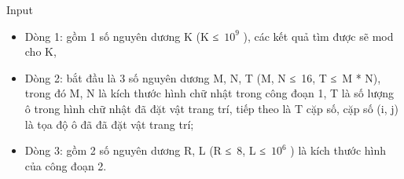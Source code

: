 Input
\begin{itemize}
	\item     Dòng 1: gồm 1 số nguyên dương K (K ≤ $10^{9}$    ), các kết quả tìm được sẽ mod cho K,   
	\item     Dòng 2: bắt đầu là 3 số nguyên dương M, N, T (M, N ≤ 16, T ≤ M * N), trong đó M, N là kích thước hình chữ nhật trong công đoạn 1, T là số lượng ô trong hình chữ nhật đã đặt vật trang trí, tiếp theo là T cặp số, cặp số (i, j) là tọa độ ô đã đã đặt vật trang trí;   
	\item     Dòng 3: gồm 2 số nguyên dương R, L (R ≤ 8, L ≤ $10^{6}$    ) là kích thước hình của công đoạn 2.   
\end{itemize}